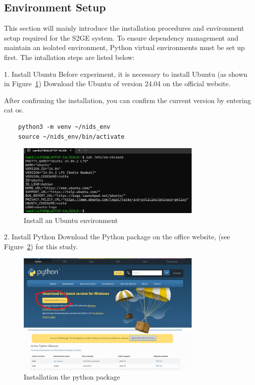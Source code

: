 \begin{ZhChapter}
    \newpage
    \section{Environment Setup}
    This section will mainly introduce the installation procedures and environment setup required for the S2GE system. To ensure dependency management and maintain an isolated environment, Python virtual environments must be set up first. The intallation steps are listed below:

    1. Install Ubuntu
    Before experiment,  it is necessary to install Ubuntu (as shown in Figure~\ref{fig:Ubuntu}) Download the Ubuntu of version 24.04 on the official website.

    After confirming the installation, you can confirm the current version by entering cat os.

    \begin{verbatim}
    python3 -m venv ~/nids_env
    source ~/nids_env/bin/activate
    \end{verbatim}
    \begin{figure}[htbp]
        \centering
        \includegraphics[width = 0.8\textwidth]{image/Ubuntu.jpg}
        \caption{Install an Ubuntu environment }
        \label{fig:Ubuntu}
    \end{figure}

    2. Install Python
    Download the Python package on the office website, (see Figure~\ref{fig:Python}) for this study.

    \begin{figure}[htbp]
        \centering
        \includegraphics[width = 0.8\textwidth]{image/python.jpg}
        \caption{Installation the python package}
        \label{fig:Python}
    \end{figure}


\end{ZhChapter}
